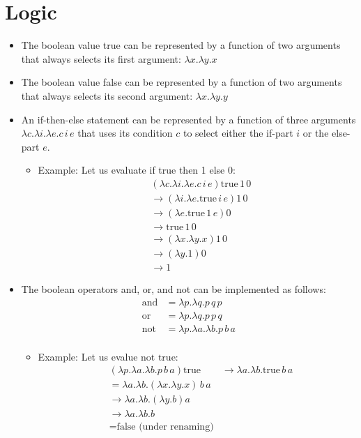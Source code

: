 \documentclass[]{article}
\begin{document}
\section{Logic}
\begin{itemize}
\item The boolean value true can be represented by a function of two arguments that always selects its first argument: $\lambda x.\lambda y.x$
\item The boolean value false can be represented by a function of two arguments that always selects its second argument: $\lambda x.\lambda y.y$
\item An if-then-else statement can be represented by a function of three arguments $\lambda c.\lambda i.\lambda e.c\,i\,e$ that uses its condition $c$ to select either the if-part $i$ or the else-part $e$.
\begin{itemize}
\item Example: Let us evaluate if true then 1 else 0:
\begin{align*}
&(\lambda c.\lambda i.\lambda e.c\,i\,e) \textrm{true}\,1\,0 \\
&\rightarrow(\lambda i.\lambda e.\textrm{true}\,i\,e)1\,0\\
&\rightarrow(\lambda e.\textrm{true}\,1\,e)0\\
&\rightarrow\textrm{true}\,1\,0\\
&\rightarrow(\lambda x.\lambda y.x)1\,0\\
&\rightarrow(\lambda y.1)0\\
&\rightarrow1
\end{align*}
\end{itemize}
\item The boolean operators and, or, and not can be implemented as follows:
\begin{align*}
\textrm{and} &= \lambda p.\lambda q.p\,q\,p\\
\textrm{or}  &= \lambda p.\lambda q.p\,p\,q\\
\textrm{not} &= \lambda p.\lambda a.\lambda b.p\,b\,a\\
\end{align*}
\begin{itemize}
\item Example: Let us evalue $\textrm{not true}$:
\begin{align*}
&(\lambda p.\lambda a.\lambda b.p\,b\,a)\textrm{true}
&\rightarrow \lambda a.\lambda b.\textrm{true}\,b\,a\\
&= \lambda a.\lambda b.(\lambda x.\lambda y.x)\,b\,a\\
&\rightarrow \lambda a.\lambda b.(\lambda y.b)a\\
&\rightarrow \lambda a.\lambda b.b\\
&= \textrm{false (under renaming)}
\end{align*}
\end{itemize}
\end{itemize}
\end{document}
